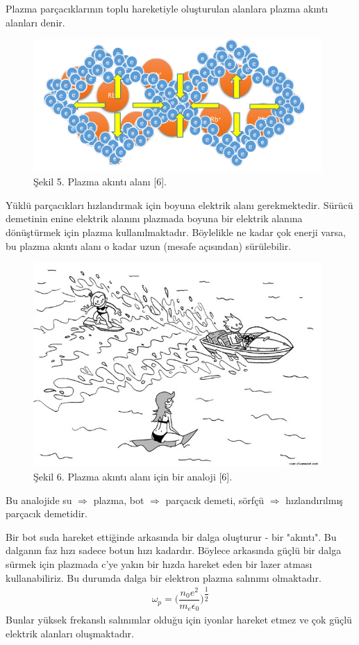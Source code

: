\documentclass{article}
\begin{document}
 Plazma parçacıklarının toplu hareketiyle oluşturulan alanlara plazma akıntı alanları denir.
 
 \begin{figure}[h]	
 \centering
\includegraphics[width=11cm]{wakefield.png}
\caption*{Şekil 5. Plazma akıntı alanı [6].}
	\end{figure}

 Yüklü parçacıkları hızlandırmak için boyuna elektrik alanı gerekmektedir. Sürücü demetinin enine elektrik alanını plazmada boyuna bir elektrik alanına dönüştürmek için plazma kullanılmaktadır. Böylelikle ne kadar çok enerji varsa, bu plazma akıntı alanı o kadar uzun (mesafe açısından) sürülebilir.
 
 
\newpage

 \begin{figure}[h]
 \centering
\includegraphics[width=11cm]{surfing.png}
\caption*{Şekil 6. Plazma akıntı alanı için bir analoji [6].}
	\end{figure}
	
Bu analojide su $\Rightarrow$ plazma, bot $\Rightarrow$ parçacık demeti, sörfçü $\Rightarrow$ hızlandırılmış parçacık demetidir.
	
Bir bot suda hareket ettiğinde arkasında bir dalga oluşturur - bir "akıntı". Bu dalganın faz hızı sadece botun hızı kadardır. Böylece arkasında güçlü bir dalga sürmek için plazmada c'ye yakın bir hızda hareket eden bir lazer atması kullanabiliriz. Bu durumda dalga bir elektron plazma salınımı olmaktadır. 
\begin{align}
    \omega_{p} = \bigg( \dfrac{n_{0} e^{2}}{m_{e} \epsilon_{0}}  \bigg)^{\dfrac{1}{2}}
\end{align}
Bunlar yüksek frekanslı salınımlar olduğu için iyonlar hareket etmez ve çok güçlü elektrik alanları oluşmaktadır.
\end{document}
